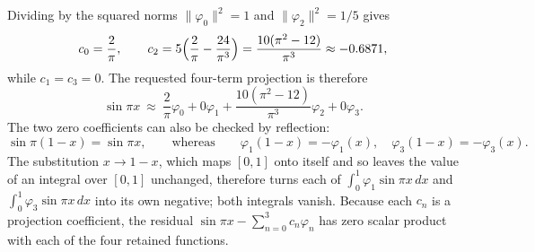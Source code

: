 Dividing by the squared norms $\|\varphi_0\|^2=1$ and
$\|\varphi_2\|^2=1/5$ gives
\[
c_0=\frac2\pi,\qquad
c_2=5\Bigl(\frac2\pi-\frac{24}{\pi^3}\Bigr)=\frac{10(\pi^2-12)}{\pi^3}
\approx-0.6871,
\]
while $c_1=c_3=0$. The requested four-term projection is therefore
\[
\boxed{\sin\pi x\ \approx\ \frac2\pi\varphi_0
 +0\varphi_1+\frac{10(\pi^2-12)}{\pi^3}\varphi_2+0\varphi_3}.
\]
The two zero coefficients can also be checked by reflection:
\[
\sin\pi(1-x)=\sin\pi x,\qquad\text{whereas}\qquad
\varphi_1(1-x)=-\varphi_1(x),\quad \varphi_3(1-x)=-\varphi_3(x).
\]
The substitution $x\to1-x$, which maps
$[0,1]$ onto itself and so leaves the value of an integral over $[0,1]$
unchanged, therefore turns each of $\int_0^1\varphi_1\sin\pi x\,dx$ and
$\int_0^1\varphi_3\sin\pi x\,dx$ into its own negative; both integrals
vanish.
Because each $c_n$ is a projection coefficient, the residual
$\sin\pi x-\sum_{n=0}^3c_n\varphi_n$ has zero scalar product with each of
the four retained functions.

